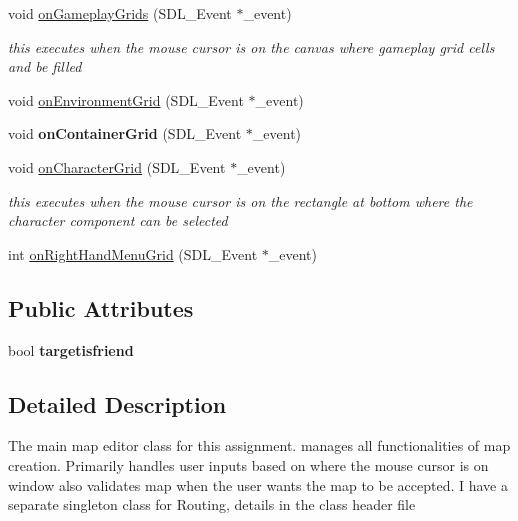\begin{DoxyCompactItemize}
\hypertarget{class_map_editor_engine_a4aa53b24a48445df239f7bc343857959}{}\label{class_map_editor_engine_a4aa53b24a48445df239f7bc343857959} 
void \hyperlink{class_map_editor_engine_a4aa53b24a48445df239f7bc343857959}{on\+Gameplay\+Grids} (S\+D\+L\+\_\+\+Event $\ast$\+\_\+event)
\begin{DoxyCompactList}\small\item\em this executes when the mouse cursor is on the canvas where gameplay grid cells and be filled \end{DoxyCompactList}\item 
void \hyperlink{class_map_editor_engine_af7f6e1fec6f7598ace52902f996980bd}{on\+Environment\+Grid} (S\+D\+L\+\_\+\+Event $\ast$\+\_\+event)
\item 
\hypertarget{class_map_editor_engine_a9d1cd8cd4d5428b30935f87121e91520}{}\label{class_map_editor_engine_a9d1cd8cd4d5428b30935f87121e91520} 
void {\bfseries on\+Container\+Grid} (S\+D\+L\+\_\+\+Event $\ast$\+\_\+event)
\item 
\hypertarget{class_map_editor_engine_ab21650a2996bc8b0d7234043b090aadc}{}\label{class_map_editor_engine_ab21650a2996bc8b0d7234043b090aadc} 
void \hyperlink{class_map_editor_engine_ab21650a2996bc8b0d7234043b090aadc}{on\+Character\+Grid} (S\+D\+L\+\_\+\+Event $\ast$\+\_\+event)
\begin{DoxyCompactList}\small\item\em this executes when the mouse cursor is on the rectangle at bottom where the character component can be selected \end{DoxyCompactList}\item 
int \hyperlink{class_map_editor_engine_a5cac60e9a046a903de4a1f570b15bb29}{on\+Right\+Hand\+Menu\+Grid} (S\+D\+L\+\_\+\+Event $\ast$\+\_\+event)
\end{DoxyCompactItemize}
\subsection*{Public Attributes}
\begin{DoxyCompactItemize}
\item 
\hypertarget{class_map_editor_engine_ab6b57a5338f484514ba283c7d3f10bfe}{}\label{class_map_editor_engine_ab6b57a5338f484514ba283c7d3f10bfe} 
bool {\bfseries targetisfriend}
\end{DoxyCompactItemize}


\subsection{Detailed Description}
The main map editor class for this assignment. manages all functionalities of map creation. Primarily handles user inputs based on where the mouse cursor is on window also validates map when the user wants the map to be accepted. I have a separate singleton class for Routing, details in the class header file 

